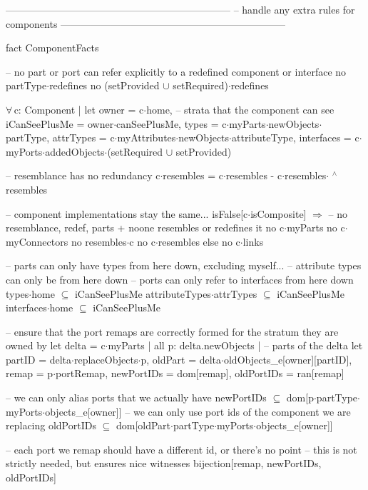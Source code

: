 --------------------------------------------------------------------
-- handle any extra rules for components
--------------------------------------------------------------------

fact ComponentFacts
{
  -- no part or port can refer explicitly to a redefined component or interface
  no partType$\cdot$redefines
  no (setProvided $\cup$ setRequired)$\cdot$redefines

  $\forall\,$c: Component |
  let
    owner = c$\cdot$home,
    -- strata that the component can see
    iCanSeePlusMe = owner$\cdot$canSeePlusMe,
    types = c$\cdot$myParts$\cdot$newObjects$\cdot$partType,
    attrTypes = c$\cdot$myAttributes$\cdot$newObjects$\cdot$attributeType,
    interfaces = c$\cdot$myPorts$\cdot$addedObjects$\cdot$(setRequired $\cup$ setProvided)
  {
    -- resemblance has no redundancy
    c$\cdot$resembles = c$\cdot$resembles - c$\cdot$resembles$\cdot$ $\!\!\!^\wedge\!$resembles

  
    -- component implementations stay the same...
    isFalse[c$\cdot$isComposite] $\Longrightarrow$
    {
      -- no resemblance, redef, parts + noone resembles or redefines it
      no c$\cdot$myParts
      no c$\cdot$myConnectors
      no resembles$\cdot$c
      no c$\cdot$resembles
    }
    else
      no c$\cdot$links

    -- parts can only have types from here down, excluding myself...
    -- attribute types can only be from here down
    -- ports can only refer to interfaces from here down
    types$\cdot$home $\subseteq$ iCanSeePlusMe
    attributeTypes$\cdot$attrTypes $\subseteq$ iCanSeePlusMe
    interfaces$\cdot$home $\subseteq$ iCanSeePlusMe
    
    -- ensure that the port remaps are correctly formed for the stratum they are owned by
    let delta = c$\cdot$myParts |
    all p: delta.newObjects | -- parts of the delta
    let
      partID = delta$\cdot$replaceObjects$\cdot$p,
      oldPart = delta$\cdot$oldObjects_e[owner][partID],
      remap = p$\cdot$portRemap,
      newPortIDs = dom[remap],
      oldPortIDs = ran[remap]
    {
      -- we can only alias ports that we actually have
      newPortIDs $\subseteq$ dom[p$\cdot$partType$\cdot$myPorts$\cdot$objects_e[owner]]
      -- we can only use port ids of the component we are replacing
      oldPortIDs $\subseteq$ dom[oldPart$\cdot$partType$\cdot$myPorts$\cdot$objects_e[owner]]
      
      -- each port we remap should have a different id, or there's no point
      -- this is not strictly needed, but ensures nice witnesses
      bijection[remap, newPortIDs, oldPortIDs]
      
}}}
